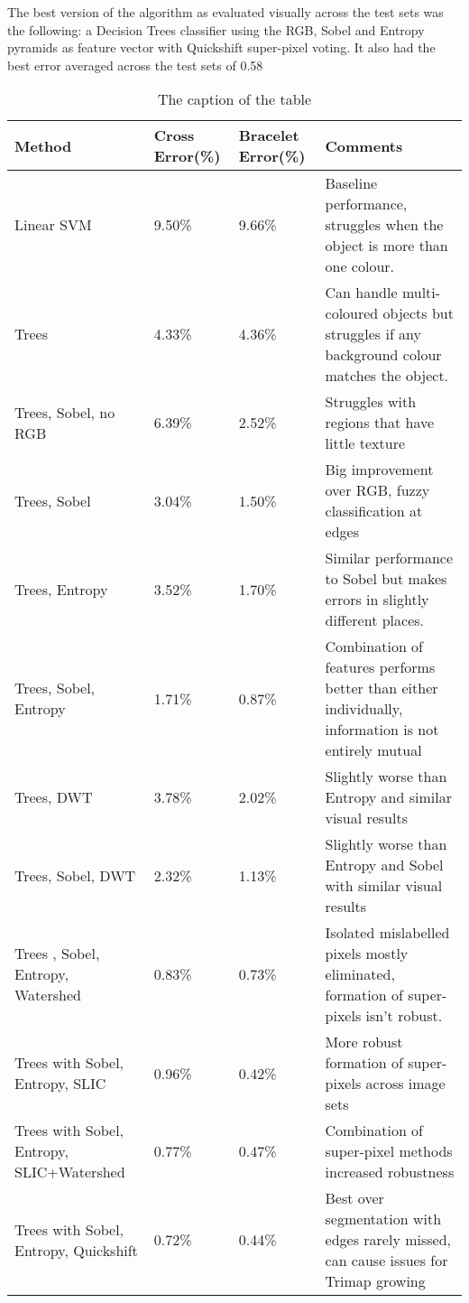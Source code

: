 \documentclass[12pt]{IIBproject}
\begin{document}
The best version of the algorithm as evaluated visually across the test sets was the following: a Decision Trees classifier using the RGB, Sobel and Entropy pyramids as feature vector with Quickshift super-pixel voting. It also had the best error averaged across the test sets of 0.58%
\begin{table}
\begin{center}
    \begin{tabular}{ | p{3cm} | l | l | p{5cm} |}
    \hline
    Method & Cross Error(\%) & Bracelet Error(\%) & Comments \\ \hline
    Linear SVM & 9.50\% & 9.66\% & Baseline performance, struggles when the object is more than one colour.\\ \hline
    Trees & 4.33\% & 4.36\% & Can handle multi-coloured objects but struggles if any background colour matches the object.\\ \hline
    Trees, Sobel, no RGB & 6.39\% & 2.52\% & Struggles with regions that have little texture \\ \hline
    Trees, Sobel & 3.04\% & 1.50\% & Big improvement over RGB, fuzzy classification at edges \\ \hline
    Trees, Entropy & 3.52\% & 1.70\% & Similar performance to Sobel but makes errors in slightly different places.\\ \hline
    Trees, Sobel, Entropy & 1.71\% & 0.87\% & Combination of features performs better than either individually, information is not entirely mutual\\
    \hline
    Trees, DWT  & 3.78\% & 2.02\% & Slightly worse than Entropy and similar visual results \\
    \hline
    Trees, Sobel, DWT & 2.32\% & 1.13\% & Slightly worse than Entropy and Sobel with similar visual results\\
    \hline
    Trees , Sobel, Entropy, Watershed & 0.83\% & 0.73\% & Isolated mislabelled pixels mostly eliminated, formation of super-pixels isn't robust. \\
    \hline
    Trees with Sobel, Entropy, SLIC & 0.96\% & 0.42\% & More robust formation of super-pixels across image sets \\
    \hline
    Trees with Sobel, Entropy, SLIC+Watershed & 0.77\% & 0.47\% & Combination of super-pixel methods increased robustness \\
    \hline
     Trees with Sobel, Entropy, Quickshift & 0.72\% & 0.44\% & Best over segmentation with edges rarely missed, can cause issues for Trimap growing\\
    \hline
     
    \end{tabular}
    \caption{The caption of the table}\label{table:somename}
\end{center}
\end{table}
 
\end{document}
